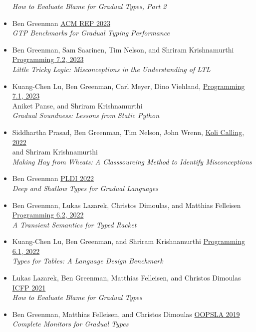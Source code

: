 \documentclass[11pt]{article}
\begin{document}
\begin{itemize}
  \emph{How to Evaluate Blame for Gradual Types, Part 2}
\item
  Ben Greenman \hfill \href{https://acm-rep.github.io/2023/}{ACM REP 2023} \\
  \emph{GTP Benchmarks for Gradual Typing Performance}
\item
  Ben Greenman, Sam Saarinen, Tim Nelson, and Shriram Krishnamurthi \hfill \href{https://2023.programming-conference.org/}{Programming 7.2, 2023} \\
  \emph{Little Tricky Logic: Misconceptions in the Understanding of LTL}
\item
  Kuang-Chen Lu, Ben Greenman, Carl Meyer, Dino Viehland, \hfill \href{https://2023.programming-conference.org/}{Programming 7.1, 2023} \\
  Aniket Panse, and Shriram Krishnamurthi \\
  \emph{Gradual Soundness: Lessons from Static Python}
\item
  Siddhartha Prasad, Ben Greenman, Tim Nelson, John Wrenn, \hfill \href{https://www.kolicalling.fi/}{Koli Calling, 2022} \\
  and Shriram Krishnamurthi \\
  \emph{Making Hay from Wheats: A Classsourcing Method to Identify Misconceptions}
\item
  Ben Greenman \hfill \href{https://pldi22.sigplan.org/}{PLDI 2022} \\
  \emph{Deep and Shallow Types for Gradual Languages}
\item
  Ben Greenman, Lukas Lazarek, Christos Dimoulas, and Matthias Felleisen \hfill \href{https://2022.programming-conference.org/}{Programming 6.2, 2022} \\
  \emph{A Transient Semantics for Typed Racket}
\item
  Kuang-Chen Lu, Ben Greenman, and Shriram Krishnamurthi \hfill \href{https://2022.programming-conference.org/}{Programming 6.1, 2022} \\
  \emph{Types for Tables: A Language Design Benchmark}
\item
  Lukas Lazarek, Ben Greenman, Matthias Felleisen, and Christos Dimoulas \hfill \href{https://icfp21.sigplan.org/}{ICFP 2021} \\
  \emph{How to Evaluate Blame for Gradual Types}
\item
  Ben Greenman, Matthias Felleisen, and Christos Dimoulas \hfill \href{https://conf.researchr.org/track/splash-2019/splash-2019-OOPSLA}{OOPSLA 2019} \\
  \emph{Complete Monitors for Gradual Types}

\end{itemize}
\end{document}
